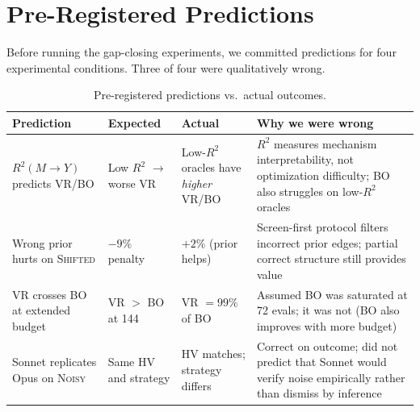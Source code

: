 \documentclass[11pt,letterpaper]{article}
\newcommand{\oracle}[1]{\textsc{#1}}
\newcommand{\shifted}{\oracle{Shifted}}
\newcommand{\noisy}{\oracle{Noisy}}
\begin{document}
\section{Pre-Registered Predictions}
\label{app:preregistration}

Before running the gap-closing experiments, we committed predictions for
four experimental conditions. Three of four were qualitatively wrong.

\begin{table}[h]
\centering
\caption{Pre-registered predictions vs.\ actual outcomes.}
\label{tab:preregistration}
\small
\begin{tabular}{@{}p{3cm}p{3cm}p{3cm}p{4cm}@{}}
\toprule
Prediction & Expected & Actual & Why we were wrong \\
\midrule
$R^2(M \!\to\! Y)$ predicts VR/BO
  & Low $R^2$ $\to$ worse VR
  & Low-$R^2$ oracles have \emph{higher} VR/BO
  & $R^2$ measures mechanism interpretability, not optimization difficulty; BO also struggles on low-$R^2$ oracles \\[4pt]
Wrong prior hurts on \shifted{}
  & $-9\%$ penalty
  & $+2\%$ (prior helps)
  & Screen-first protocol filters incorrect prior edges; partial correct structure still provides value \\[4pt]
VR crosses BO at extended budget
  & VR $>$ BO at 144
  & VR $= 99\%$ of BO
  & Assumed BO was saturated at 72 evals; it was not (BO also improves with more budget) \\[4pt]
Sonnet replicates Opus on \noisy{}
  & Same HV and strategy
  & HV matches; strategy differs
  & Correct on outcome; did not predict that Sonnet would verify noise empirically rather than dismiss by inference \\
\bottomrule
\end{tabular}
\end{table}
\end{document}
